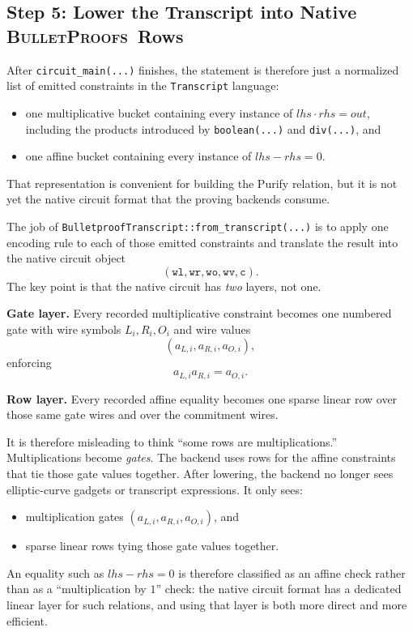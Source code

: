 \documentclass[11pt]{article}
\DeclareRobustCommand{\bp}{{\normalfont\scshape BulletProofs}}
\begin{document}
\subsection{Step 5: Lower the Transcript into Native \bp\ Rows}

After \texttt{circuit\_main(...)} finishes, the statement is therefore just a normalized list of
emitted constraints in the \texttt{Transcript} language:
\begin{itemize}[nosep]
  \item one multiplicative bucket containing every instance of $lhs \cdot rhs = out$, including the
  products introduced by \texttt{boolean(...)} and \texttt{div(...)}, and
  \item one affine bucket containing every instance of $lhs-rhs=0$.
\end{itemize}
That representation is convenient for building the Purify relation, but it is not yet the native
circuit format that the proving backends consume.

The job of \texttt{BulletproofTranscript::from\_transcript(...)} is to apply one encoding rule to
each of those emitted constraints and translate the result into the native circuit object
\[
(\texttt{wl}, \texttt{wr}, \texttt{wo}, \texttt{wv}, \texttt{c}).
\]
The key point is that the native circuit has \emph{two} layers, not one.

\medskip\noindent\textbf{Gate layer.}
Every recorded multiplicative constraint becomes one numbered gate with wire symbols
$L_i,R_i,O_i$ and wire values
\[
(a_{L,i}, a_{R,i}, a_{O,i}),
\]
enforcing
\[
a_{L,i} a_{R,i} = a_{O,i}.
\]

\medskip\noindent\textbf{Row layer.}
Every recorded affine equality becomes one sparse linear row over those same gate wires and over
the commitment wires.

It is therefore misleading to think ``some rows are multiplications.'' Multiplications become
\emph{gates}.
The backend uses rows for the affine constraints that tie those gate values together. After lowering, the
backend no longer sees elliptic-curve gadgets or transcript expressions. It only sees:
\begin{itemize}[nosep]
  \item multiplication gates $(a_{L,i}, a_{R,i}, a_{O,i})$, and
  \item sparse linear rows tying those gate values together.
\end{itemize}
An equality such as $lhs-rhs=0$ is therefore classified as an affine check rather than as a
``multiplication by $1$'' check: the native circuit format has a dedicated linear layer for such
relations, and using that layer is both more direct and more efficient.
\end{document}
